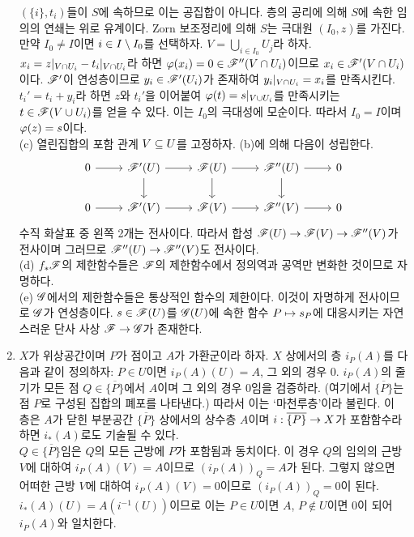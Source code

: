 \begin{enumerate}[label=\tb{1.\arabic*.},itemindent=0mm,itemsep=4mm]
	$(\{i\},t_i)$들이 $S$에 속하므로 이는 공집합이 아니다.
	층의 공리에 의해 $S$에 속한 임의의 연쇄는 위로 유계이다. Zorn 보조정리에 의해 $S$는 극대원 $(I_0,z)$를 가진다.
	만약 $I_0\ne I$이면 $i\in I\setminus I_0$를 선택하자. $V=\bigcup_{i\in I_0}U_j$라 하자.
	$x_i=z|_{V\cap U_i}-t_i|_{V\cap U_i}$라 하면 $\varphi(x_i)=0\in\mathscr{F}''(V\cap U_i)$이므로 $x_i\in\mathscr{F}'(V\cap U_i)$이다.
	$\mathscr{F}'$이 연성층이므로 $y_i\in\mathscr{F}'(U_i)$가 존재하여 $y_i|_{V\cap U_i}=x_i$를 만족시킨다.
	$t_i'=t_i+y_i$라 하면 $z$와 $t_i'$을 이어붙여 $\varphi(t)=s|_{V\cup U_i}$를 만족시키는 $t\in\mathscr{F}(V\cup U_i)$를 얻을 수 있다.
	이는 $I_0$의 극대성에 모순이다. 따라서 $I_0=I$이며 $\varphi(z)=s$이다.\\
	(c) 열린집합의 포함 관계 $V\subseteq U$를 고정하자. (b)에 의해 다음이 성립한다.
	$$\begin{tikzcd}0\arrow[r]&\ms F'(U)\arrow[r]\arrow[d]&\ms F(U)\arrow[r]\arrow[d]&\ms F''(U)\arrow[r]\arrow[d]&0\\
	0\arrow[r]&\ms F'(V)\arrow[r]&\ms F(V)\arrow[r]&\ms F''(V)\arrow[r]&0\end{tikzcd}$$
	수직 화살표 중 왼쪽 2개는 전사이다. 따라서 합성 $\mathscr{F}(U)\rightarrow\mathscr{F}(V)\rightarrow\mathscr{F}''(V)$가 전사이며
	그러므로 $\mathscr{F}''(U)\rightarrow\mathscr{F}''(V)$도 전사이다.\\
	(d) $f_*\mathscr{F}$의 제한함수들은 $\mathscr{F}$의 제한함수에서 정의역과 공역만 변화한 것이므로 자명하다.\\
	(e) $\mathscr{G}$에서의 제한함수들은 통상적인 함수의 제한이다. 이것이 자명하게 전사이므로 $\mathscr{G}$가 연성층이다.
	$s\in\mathscr{F}(U)$를 $\mathscr{G}(U)$에 속한 함수 $P\mapsto s_P$에 대응시키는 자연스러운 단사 사상 $\mathscr{F}\rightarrow\mathscr{G}$가 존재한다.
	\item {} $X$가 위상공간이며 $P$가 점이고 $A$가 가환군이라 하자.
	$X$ 상에서의 층 $i_P(A)$를 다음과 같이 정의하자: $P\in U$이면 $i_P(A)(U)=A$, 그 외의 경우 $0$.
	$i_P(A)$의 줄기가 모든 점 $Q\in\overline{\{P\}}$에서 $A$이며 그 외의 경우 $0$임을 검증하라.
	(여기에서 $\overline{\{P\}}$는 점 $P$로 구성된 집합의 폐포를 나타낸다.) 따라서 이는 `마천루층'이라 불린다.
	이 층은 $A$가 닫힌 부분공간 $\overline{\{P\}}$ 상에서의 상수층 $A$이며
	$i:\overline{\{P\}}\rightarrow X$가 포함함수라 하면 $i_*(A)$로도 기술될 수 있다.\\
	\sol $Q\in\overline{\{P\}}$임은 $Q$의 모든 근방에 $P$가 포함됨과 동치이다.
	이 경우 $Q$의 임의의 근방 $V$에 대하여 $i_P(A)(V)=A$이므로 $(i_P(A))_Q=A$가 된다.
	그렇지 않으면 어떠한 근방 $V$에 대하여 $i_P(A)(V)=0$이므로 $(i_P(A))_Q=0$이 된다.
	$i_*(A)(U)=A(i^{-1}(U))$이므로 이는 $P\in U$이면 $A$, $P\notin U$이면 $0$이 되어 $i_P(A)$와 일치한다.

\end{enumerate}
